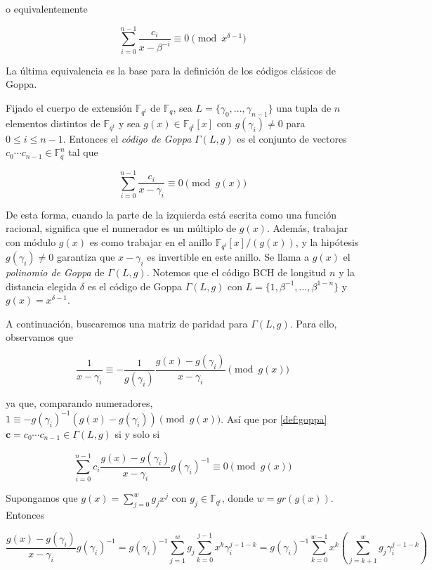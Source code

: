 o equivalentemente

$$\sum_{i=0}^{n-1} \frac{c_i}{x - \beta ^{-i}} \equiv 0 \pmod{x^{\delta - 1}}$$

La última equivalencia es la base para la definición de los códigos clásicos de Goppa.

Fijado el cuerpo de extensión $\mathbb{F}_{q^t}$ de $\mathbb{F}_q$, sea $L = \{ \gamma_0, ..., \gamma_{n-1} \}$ una tupla de $n$ elementos distintos de $\mathbb{F}_{q^t}$ y sea $g(x) \in \mathbb{F}_{q^t}[x]$ con $g(\gamma_i) \neq 0$ para $0 \leq i \leq n - 1$. Entonces el \emph{código de Goppa} $\Gamma(L,g)$ es el conjunto de vectores $c_0 \cdots c_{n-1} \in \mathbb{F}_q^n$ tal que 

\begin{equation}
    \label{def:goppa}
    \sum_{i=0}^{n-1} \frac{c_i}{x - \gamma_i} \equiv 0 \pmod{g(x)}
\end{equation}

De esta forma, cuando la parte de la izquierda está escrita como una función racional, significa que el numerador es un múltiplo de $g(x)$. Además, trabajar con módulo $g(x)$ es como trabajar en el anillo $\mathbb{F}_{q^t}[x]/(g(x))$, y la hipótesis $g(\gamma_i) \neq 0$ garantiza que $x - \gamma_i$ es invertible en este anillo. Se llama a $g(x)$ el \emph{polinomio de Goppa} de $\Gamma(L,g)$. Notemos que el código BCH de longitud $n$ y la distancia elegida $\delta$ es el código de Goppa $\Gamma(L,g)$ con $L = \{ 1, \beta^{-1}, ..., \beta^{1-n} \}$ y $g(x) = x^{\delta - 1}$.

A continuación, buscaremos una matriz de paridad para $\Gamma(L,g)$. Para ello, observamos que

$$\frac{1}{x - \gamma_i} \equiv - \frac{1}{g(\gamma_i)} \frac{g(x) - g(\gamma_i)}{x - \gamma_i} \pmod{ g(x)}$$

ya que, comparando numeradores, $1 \equiv - g(\gamma_i)^{-1} \left( g(x) - g(\gamma_i) \right) \pmod{g(x)}$. Así que por \eqref{def:goppa} $\textbf{c} = c_0 \cdots c_{n-1} \in \Gamma(L,g)$ si y solo si

\begin{equation}
    \label{congruencia_goppa}
    \sum_{i=0}^{n-1} c_i \frac{g(x) - g(\gamma_i)}{x - \gamma_i} g(\gamma_i)^{-1} \equiv 0 \pmod{g(x)}
\end{equation}

Supongamos que $g(x) = \sum_{j=0}^w g_j x^j$ con $g_j \in \mathbb{F}_{q^t}$, donde $w = gr(g(x))$. Entonces

$$\frac{g(x) - g(\gamma_i)}{x - \gamma_i} g(\gamma_i)^{-1} = g(\gamma_i)^{-1} \sum_{j=1}^w g_j \sum_{k=0}^{j-1} x^k \gamma_i^{j-1-k} = g(\gamma_i)^{-1} \sum_{k=0}^{w-1} x^k \left( \sum_{j=k+1}^w g_j \gamma_i^{j-1-k} \right)$$

